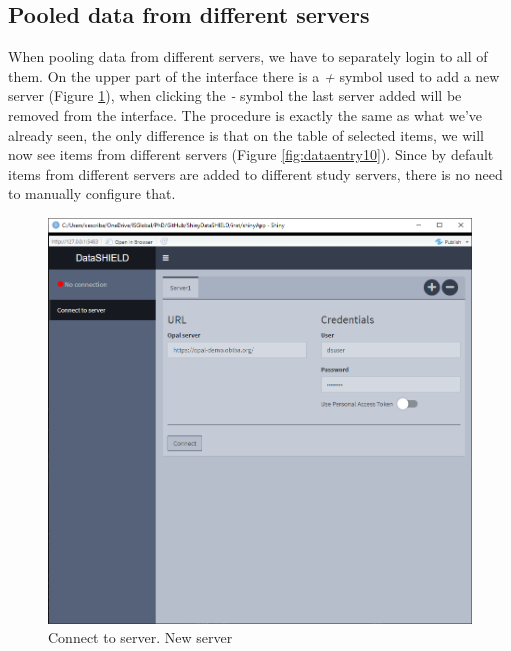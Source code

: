 \documentclass[
]{book}
\begin{document}
\hypertarget{pooled-data-from-different-servers}{%
\subsection{Pooled data from different servers}\label{pooled-data-from-different-servers}}

When pooling data from different servers, we have to separately login to all of them. On the upper part of the interface there is a \emph{+} symbol used to add a new server (Figure \ref{fig:dataentry9}), when clicking the \emph{-} symbol the last server added will be removed from the interface. The procedure is exactly the same as what we've already seen, the only difference is that on the table of selected items, we will now see items from different servers (Figure \ref{fig:dataentry10}). Since by default items from different servers are added to different study servers, there is no need to manually configure that.

\begin{figure}

{\centering \includegraphics[width=12.68in]{images/data_entry9} 

}

\caption{Connect to server. New server}\label{fig:dataentry9}
\end{figure}
\end{document}
